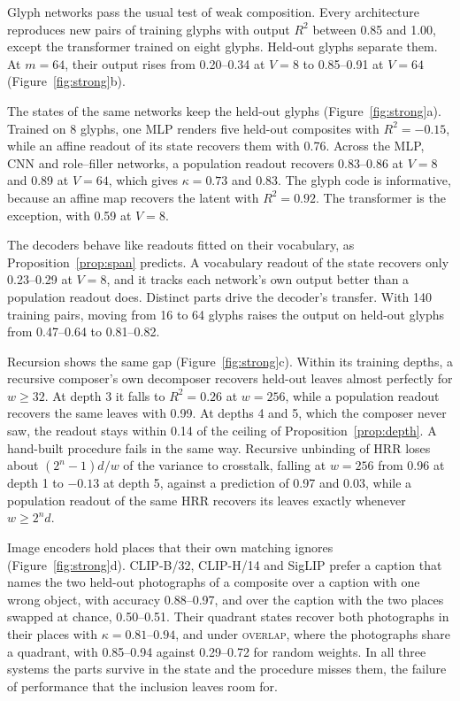 Glyph networks pass the usual test of weak composition. Every architecture reproduces new pairs of training glyphs with output $R^2$ between 0.85 and 1.00, except the transformer trained on eight glyphs. Held-out glyphs separate them. At $m = 64$, their output rises from 0.20--0.34 at $V = 8$ to 0.85--0.91 at $V = 64$ (Figure~\ref{fig:strong}b).

The states of the same networks keep the held-out glyphs (Figure~\ref{fig:strong}a). Trained on 8 glyphs, one MLP renders five held-out composites with $R^2 = -0.15$, while an affine readout of its state recovers them with 0.76. Across the MLP, CNN and role--filler networks, a population readout recovers 0.83--0.86 at $V = 8$ and 0.89 at $V = 64$, which gives $\kappa = 0.73$ and $0.83$. The glyph code is informative, because an affine map recovers the latent with $R^2 = 0.92$. The transformer is the exception, with 0.59 at $V = 8$.

The decoders behave like readouts fitted on their vocabulary, as Proposition~\ref{prop:span} predicts. A vocabulary readout of the state recovers only 0.23--0.29 at $V = 8$, and it tracks each network's own output better than a population readout does. Distinct parts drive the decoder's transfer. With 140 training pairs, moving from 16 to 64 glyphs raises the output on held-out glyphs from 0.47--0.64 to 0.81--0.82.

Recursion shows the same gap (Figure~\ref{fig:strong}c). Within its training depths, a recursive composer's own decomposer recovers held-out leaves almost perfectly for $w \ge 32$. At depth 3 it falls to $R^2 = 0.26$ at $w = 256$, while a population readout recovers the same leaves with 0.99. At depths 4 and 5, which the composer never saw, the readout stays within 0.14 of the ceiling of Proposition~\ref{prop:depth}. A hand-built procedure fails in the same way. Recursive unbinding of HRR loses about $(2^n - 1)d/w$ of the variance to crosstalk, falling at $w = 256$ from 0.96 at depth 1 to $-0.13$ at depth 5, against a prediction of 0.97 and 0.03, while a population readout of the same HRR recovers its leaves exactly whenever $w \ge 2^n d$.

Image encoders hold places that their own matching ignores (Figure~\ref{fig:strong}d). CLIP-B/32, CLIP-H/14 and SigLIP prefer a caption that names the two held-out photographs of a composite over a caption with one wrong object, with accuracy 0.88--0.97, and over the caption with the two places swapped at chance, 0.50--0.51. Their quadrant states recover both photographs in their places with $\kappa = 0.81$--$0.94$, and under \textsc{overlap}, where the photographs share a quadrant, with 0.85--0.94 against 0.29--0.72 for random weights. In all three systems the parts survive in the state and the procedure misses them, the failure of performance that the inclusion leaves room for.

